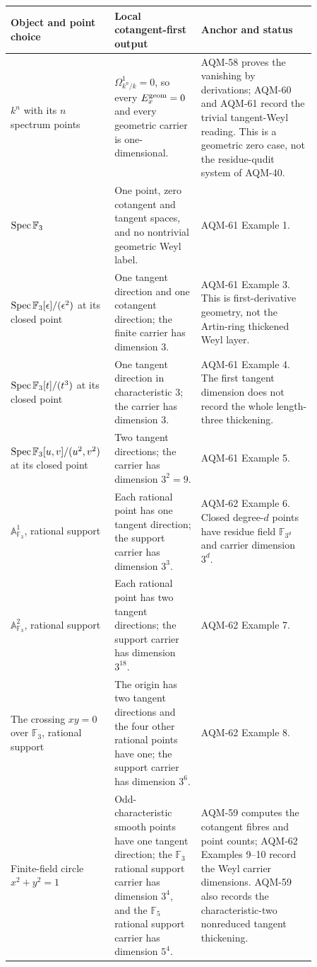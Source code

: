 \begin{center}
\small
\begin{tabular}{p{0.23\linewidth}p{0.27\linewidth}p{0.36\linewidth}}
\toprule
Object and point choice & Local cotangent-first output & Anchor and status \\
\midrule
\(k^n\) with its \(n\) spectrum points &
\(\Omega^1_{k^n/k}=0\), so every
\(E_x^{\rm geom}=0\) and every geometric carrier is one-dimensional. &
AQM-58 proves the vanishing by derivations; AQM-60 and AQM-61 record the
trivial tangent-Weyl reading.  This is a geometric zero case, not the
residue-qudit system of AQM-40. \\
\addlinespace
\(\operatorname{Spec}\mathbb F_3\) &
One point, zero cotangent and tangent spaces, and no nontrivial geometric
Weyl label. &
AQM-61 Example 1. \\
\addlinespace
\(\operatorname{Spec}\mathbb F_3[\epsilon]/(\epsilon^2)\) at its closed point &
One tangent direction and one cotangent direction; the finite carrier has
dimension \(3\). &
AQM-61 Example 3.  This is first-derivative geometry, not the Artin-ring
thickened Weyl layer. \\
\addlinespace
\(\operatorname{Spec}\mathbb F_3[t]/(t^3)\) at its closed point &
One tangent direction in characteristic \(3\); the carrier has dimension
\(3\). &
AQM-61 Example 4.  The first tangent dimension does not record the whole
length-three thickening. \\
\addlinespace
\(\operatorname{Spec}\mathbb F_3[u,v]/(u^2,v^2)\) at its closed point &
Two tangent directions; the carrier has dimension \(3^2=9\). &
AQM-61 Example 5. \\
\addlinespace
\(\mathbb A^1_{\mathbb F_3}\), rational support &
Each rational point has one tangent direction; the support carrier has
dimension \(3^3\). &
AQM-62 Example 6.  Closed degree-\(d\) points have residue field
\(\mathbb F_{3^d}\) and carrier dimension \(3^d\). \\
\addlinespace
\(\mathbb A^2_{\mathbb F_3}\), rational support &
Each rational point has two tangent directions; the support carrier has
dimension \(3^{18}\). &
AQM-62 Example 7. \\
\addlinespace
The crossing \(xy=0\) over \(\mathbb F_3\), rational support &
The origin has two tangent directions and the four other rational points have
one; the support carrier has dimension \(3^6\). &
AQM-62 Example 8. \\
\addlinespace
Finite-field circle \(x^2+y^2=1\) &
Odd-characteristic smooth points have one tangent direction; the
\(\mathbb F_3\) rational support carrier has dimension \(3^4\), and the
\(\mathbb F_5\) rational support carrier has dimension \(5^4\). &
AQM-59 computes the cotangent fibres and point counts; AQM-62 Examples 9--10
record the Weyl carrier dimensions.  AQM-59 also records the
characteristic-two nonreduced tangent thickening. \\
\bottomrule
\end{tabular}
\end{center}

